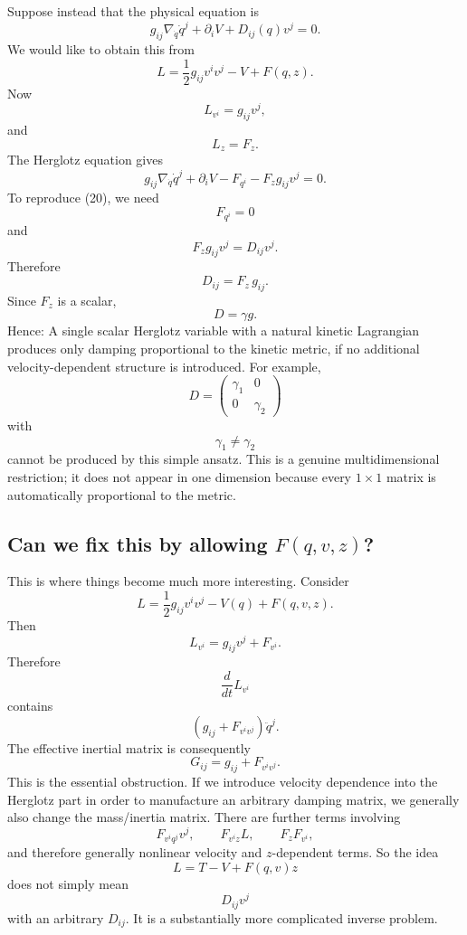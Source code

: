 Suppose instead that the physical equation is
\begin{equation}
 g_{ij}\nabla_{\dot q}\dot q^j + \partial_iV + D_{ij}(q)v^j =0. \tag{20} 
\end{equation}
We would like to obtain this from
\begin{equation}
 L= \frac12g_{ij}v^iv^j - V + F(q,z). \tag{21} 
\end{equation}
Now
$$ L_{v^i}=g_{ij}v^j, $$
and
$$ L_z=F_z. $$
The Herglotz equation gives
\begin{equation}
 g_{ij}\nabla_{\dot q}\dot q^j + \partial_iV - F_{q^i} - F_zg_{ij}v^j =0. \tag{22} 
\end{equation}
To reproduce (20), we need
$$ F_{q^i}=0 $$
and
$$ F_zg_{ij}v^j=D_{ij}v^j. $$
Therefore
\begin{equation}
 \boxed{ D_{ij}=F_z\,g_{ij}. } \tag{23} 
\end{equation}
Since \(F_z\) is a scalar,
\begin{equation}
 \boxed{ D=\gamma g. } \tag{24} 
\end{equation}
Hence:
A single scalar Herglotz variable with a natural kinetic Lagrangian produces only damping proportional to the kinetic metric, if no additional velocity-dependent structure is introduced.
For example,
$$ D= \begin{pmatrix} \gamma_1&0\\ 0&\gamma_2 \end{pmatrix} $$
with
$$ \gamma_1\neq\gamma_2 $$
cannot be produced by this simple ansatz.
This is a genuine multidimensional restriction; it does not appear in one dimension because every \(1\times1\) matrix is automatically proportional to the metric.

\subsection{Can we fix this by allowing \(F(q,v,z)\)?}

This is where things become much more interesting.
Consider
\begin{equation}
 L= \frac12g_{ij}v^iv^j-V(q)+F(q,v,z). \tag{25} 
\end{equation}
Then
$$ L_{v^i} = g_{ij}v^j+F_{v^i}. $$
Therefore
$$ \frac{d}{dt}L_{v^i} $$
contains
$$ \left(g_{ij}+F_{v^iv^j}\right)\ddot q^j. $$
The effective inertial matrix is consequently
\begin{equation}
 \boxed{ G_{ij} = g_{ij}+F_{v^iv^j}. } \tag{26} 
\end{equation}
This is the essential obstruction.
If we introduce velocity dependence into the Herglotz part in order to manufacture an arbitrary damping matrix, we generally also change the mass/inertia matrix.
There are further terms involving
$$ F_{v^iq^j}v^j, \qquad F_{v^iz}L, \qquad F_zF_{v^i}, $$
and therefore generally nonlinear velocity and \(z\)-dependent terms.
So the idea
$$ L=T-V+F(q,v)z $$
does not simply mean
$$ D_{ij}v^j $$
with an arbitrary \(D_{ij}\).
It is a substantially more complicated inverse problem.

